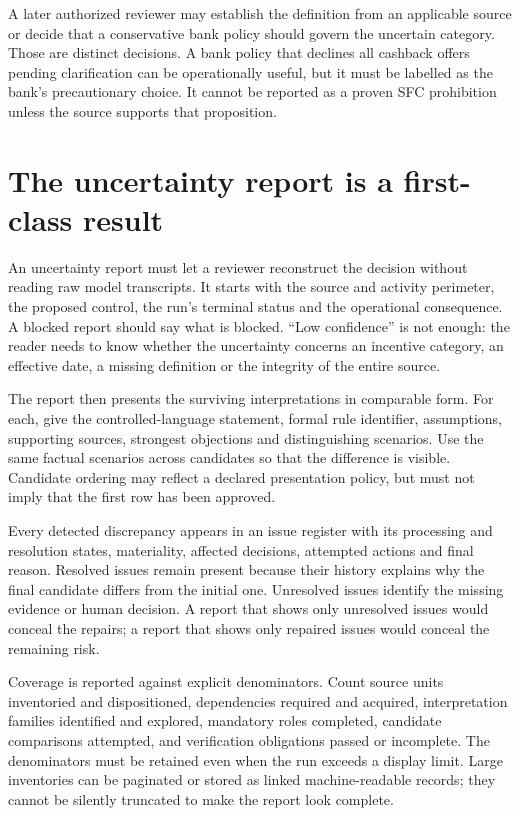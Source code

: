 A later authorized reviewer may establish the definition from an applicable
source or decide that a conservative bank policy should govern the uncertain
category. Those are distinct decisions. A bank policy that declines all cashback
offers pending clarification can be operationally useful, but it must be labelled
as the bank's precautionary choice. It cannot be reported as a proven SFC
prohibition unless the source supports that proposition.

\section{The uncertainty report is a first-class result}
\label{merge:M06:22}


An uncertainty report must let a reviewer reconstruct the decision without
reading raw model transcripts. It starts with the source and activity perimeter,
the proposed control, the run's terminal status and the operational consequence.
A blocked report should say what is blocked. ``Low confidence'' is not enough:
the reader needs to know whether the uncertainty concerns an incentive category,
an effective date, a missing definition or the integrity of the entire source.

The report then presents the surviving interpretations in comparable form. For
each, give the controlled-language statement, formal rule identifier, assumptions,
supporting sources, strongest objections and distinguishing scenarios. Use the
same factual scenarios across candidates so that the difference is visible.
Candidate ordering may reflect a declared presentation policy, but must not imply
that the first row has been approved.

Every detected discrepancy appears in an issue register with its processing and
resolution states, materiality, affected decisions, attempted actions and final
reason. Resolved issues remain present because their history explains why the
final candidate differs from the initial one. Unresolved issues identify the
missing evidence or human decision. A report that shows only unresolved issues
would conceal the repairs; a report that shows only repaired issues would conceal
the remaining risk.

Coverage is reported against explicit denominators. Count source units inventoried
and dispositioned, dependencies required and acquired, interpretation families
identified and explored, mandatory roles completed, candidate comparisons
attempted, and verification obligations passed or incomplete. The denominators
must be retained even when the run exceeds a display limit. Large inventories
can be paginated or stored as linked machine-readable records; they cannot be
silently truncated to make the report look complete.

